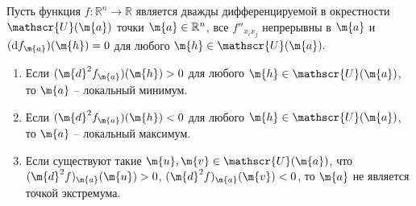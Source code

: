 \begin{theorem}
    Пусть функция $f:\mathbb{R}^n \to \mathbb{R}$ является дважды дифференцируемой в окрестности $\mathscr{U}(\m{a})$ точки $\m{a} \in \mathbb{R}^n$, все $f''_{x_ix_j}$ непрерывны в $\m{a}$ и $(\mathrm{d}f_\m{a})(\m{h}) = 0$ для любого $\m{h} \in \mathscr{U}(\m{a}).$ 
    \begin{enumerate}
        \item Если $(\m{d}^2f_\m{a})(\m{h}) >0 $ для любого $\m{h} \in \mathscr{U}(\m{a})$, то $\m{a}$ -- локальный минимум.
        \item Если $(\m{d}^2f_\m{a})(\m{h}) <0 $ для любого $\m{h} \in \mathscr{U}(\m{a})$, то $\m{a}$ -- локальный максимум.
        \item Если существуют такие $\m{u}, \m{v} \in \mathscr{U}(\m{a})$, что $(\m{d}^2f)_\m{a}(\m{u}) >0$, $(\m{d}^2f)_\m{a}(\m{v}) <0$, то $\m{a}$ не является точкой экстремума. 
    \end{enumerate}
\end{theorem}

